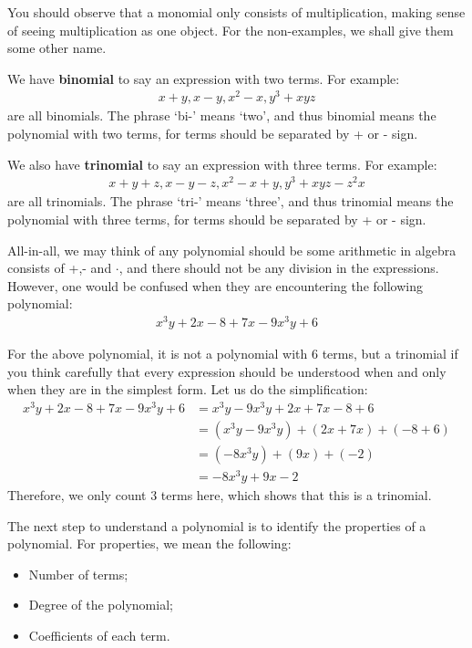 \documentclass[12pt]{article}
\begin{document}
    You should observe that a monomial only consists of multiplication, making sense of seeing multiplication as one object. For the non-examples, we shall give them some other name.

    We have \textbf{binomial} to say an expression with two terms. For example:\begin{align*}
        x+y,x-y,x^2-x,y^3+xyz
    \end{align*}
    are all binomials. The phrase `bi-' means `two', and thus binomial means the polynomial with two terms, for terms should be separated by + or - sign.

    We also have \textbf{trinomial} to say an expression with three terms. For example:\begin{align*}
        x+y+z,x-y-z,x^2-x+y,y^3+xyz-z^2x
    \end{align*}
    are all trinomials. The phrase `tri-' means `three', and thus trinomial means the polynomial with three terms, for terms should be separated by + or - sign.

    All-in-all, we may think of any polynomial should be some arithmetic in algebra consists of +,- and $\cdot$, and there should not be any division in the expressions. However, one would be confused when they are encountering the following polynomial:\begin{align*}
        x^3y+2x-8+7x-9x^3y+6
    \end{align*}

    For the above polynomial, it is not a polynomial with 6 terms, but a trinomial if you think carefully that every expression should be understood when and only when they are in the simplest form. Let us do the simplification:\begin{align*}
        x^3y+2x-8+7x-9x^3y+6&=x^3y-9x^3y+2x+7x-8+6\\
        &=(x^3y-9x^3y)+(2x+7x)+(-8+6)\\
        &=(-8x^3y)+(9x)+(-2)\\
        &=-8x^3y+9x-2
    \end{align*}
    Therefore, we only count 3 terms here, which shows that this is a trinomial.

    The next step to understand a polynomial is to identify the properties of a polynomial. For properties, we mean the following:\begin{itemize}
        \item Number of terms;
        \item Degree of the polynomial;
        \item Coefficients of each term.
    \end{itemize}
\end{document}
